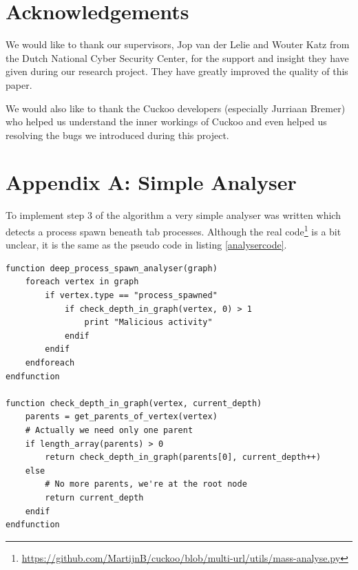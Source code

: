 \documentclass{scrartcl}
\begin{document}
\clearpage

\section*{Acknowledgements}

We would like to thank our supervisors, Jop van der Lelie and Wouter Katz from the Dutch National Cyber Security Center, for the support and insight they have given during our research project. They have greatly improved the quality of this paper.

We would also like to thank the Cuckoo developers (especially Jurriaan Bremer) who helped us understand the inner workings of Cuckoo and even helped us resolving the bugs we introduced during this project.

\clearpage




\clearpage

\section*{Appendix A: Simple Analyser}

To implement step 3 of the algorithm a very simple analyser was written which detects a process spawn beneath tab processes. Although the real code\footnote{\url{https://github.com/MartijnB/cuckoo/blob/multi-url/utils/mass-analyse.py}} is a bit unclear, it is the same as the pseudo code in listing \ref{analysercode}.

\begin{lstlisting}[caption={Pseudo code for phase 3 of the algorithm},label={analysercode}]
function deep_process_spawn_analyser(graph)
    foreach vertex in graph
        if vertex.type == "process_spawned"
            if check_depth_in_graph(vertex, 0) > 1
                print "Malicious activity"
            endif
        endif
    endforeach
endfunction

function check_depth_in_graph(vertex, current_depth)
    parents = get_parents_of_vertex(vertex)
    # Actually we need only one parent
    if length_array(parents) > 0
        return check_depth_in_graph(parents[0], current_depth++)
    else
        # No more parents, we're at the root node
        return current_depth
    endif
endfunction
\end{lstlisting}
\end{document}
